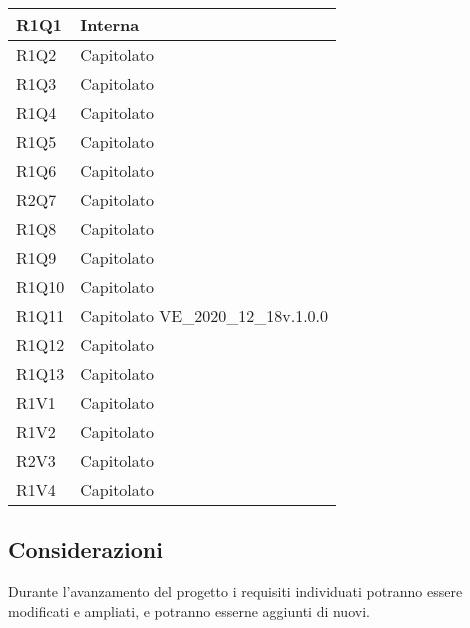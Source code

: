 \begin{center}
\begin{longtable}{|p{22mm}|p{44mm}|}
R1Q1 &
Interna \newline
\\
\hline

R1Q2 &
Capitolato \newline
\\
\hline

R1Q3 &
Capitolato \newline
\\
\hline

R1Q4 &
Capitolato \newline
\\
\hline

R1Q5 &
Capitolato \newline
\\
\hline

R1Q6 &
Capitolato \newline
\\
\hline

R2Q7 &
Capitolato \newline
\\
\hline

R1Q8 &
Capitolato \newline
\\
\hline

R1Q9 &
Capitolato \newline
\\
\hline

R1Q10 &
Capitolato \newline
\\
\hline

R1Q11 &
Capitolato \newline
VE\_2020\_12\_18v.1.0.0 \newline
\\
\hline

R1Q12 &
Capitolato \newline
\\
\hline

R1Q13 &
Capitolato \newline
\\
\hline

R1V1 &
Capitolato \newline
\\
\hline

R1V2 &
Capitolato \newline
\\
\hline

R2V3 &
Capitolato \newline
\\
\hline

R1V4 &
Capitolato \newline
\\
\hline
	
	\end{longtable}
\end{center}

\subsection{Considerazioni}
Durante l'avanzamento del progetto i requisiti individuati potranno essere modificati e ampliati, e potranno esserne aggiunti di nuovi.